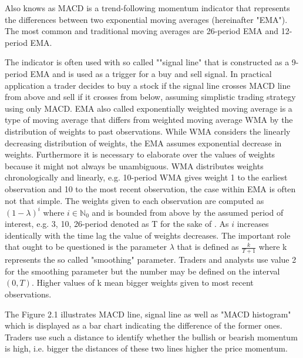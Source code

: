 Also knows as MACD is a trend-following momentum indicator that represents the differences between two exponential moving averages (hereinafter "EMA"). The most common and traditional moving averages are 26-period EMA and 12-period EMA. 

The indicator is often used with so called ""signal line" that is constructed as a 9-period EMA and is used as a trigger for a buy and sell signal. In practical application a trader decides to buy a stock if the signal line crosses MACD line from above and sell if it crosses from below, assuming simplistic trading strategy using only MACD. EMA also called exponentially weighted moving average is a type of moving average that differs from weighted moving average WMA by the distribution of weights to past observations. While WMA considers the linearly decreasing distribution of weights, the EMA assumes exponential decrease in weights. Furthermore it is necessary to elaborate over the values of weights because it might not always be unambiguous. WMA distributes weights chronologically and linearly, e.g. 10-period WMA gives weight 1 to the earliest observation and 10 to the most recent observation, the case within EMA is often not that simple. The weights given to each observation are computed as $(1 - \lambda)^i$ where $i \in \mathbb{N}_0$ and is bounded from above by the assumed period of interest, e.g. 3, 10, 26-period denoted as T for the sake of . As $i$ increases identically with the time lag the value of weights decreases. The important role that ought to be questioned is the parameter $\lambda$ that is defined as $\frac{k}{T+1}$ where k represents the so called "smoothing" parameter. Traders and analysts use value 2 for the smoothing parameter but the number may be defined on the interval $(0,T)$. Higher values of k mean bigger weights given to most recent observations. 

The Figure 2.1 illustrates MACD line, signal line as well as "MACD histogram" which is displayed as a bar chart indicating the difference of the former ones. Traders use such a distance to identify whether the bullish or bearish momentum is high, i.e. bigger the distances of these two lines higher the price momentum.

